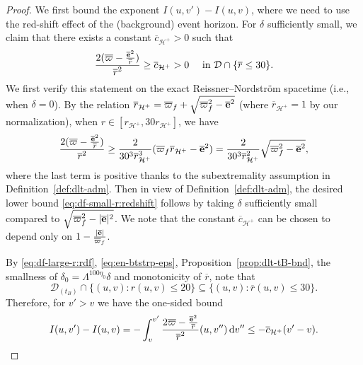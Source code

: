 \documentclass[10pt, reqno]{amsart}
\theoremstyle{definition}
\theoremstyle{remark}
\theoremstyle{conjecture}
\numberwithin{equation}{section}
\newcommand{\abs}[1]{\vert#1\vert}
\newcommand{\set}[1]{\{#1\}}
\newcommand{\ud}{\mathrm{d}}
\newcommand{\0}{\emptyset}
\newcommand{\dlt}{\delta}
\newcommand{\Lmb}{\Lambda}
\newcommand{\bfe}{{\bf e}}
\newcommand{\calD}{\mathcal D}
\newcommand{\calH}{\mathcal H}
\newcommand{\de}{\delta}
\newcommand{\EH}{\calH^{+}}
\newcommand{\e}{\bfe}							%
\newcommand{\rbg}{\overline{r}}					%
\newcommand{\varpibg}{\overline{\varpi}}				%
\newcommand{\ebg}{\overline{\e}}					%
\begin{document}
\begin{proof}
We first bound the exponent $I(u, v') - I(u, v)$, where we need to use the red-shift effect of the (background) event horizon. For $\dlt$ sufficiently small, we claim that there exists a constant $\overline{c}_{\EH} > 0$  such that
\begin{equation} \label{eq:df-small-r:redshift}
\frac{2 (\varpibg - \frac{\ebg^{2}}{\rbg})}{\rbg^{2}} \geq \overline{c}_{\EH} > 0 \quad \hbox{ in } \calD \cap \set{\rbg \leq 30}.
\end{equation}
We first verify this statement on the exact Reissner--Nordstr\"om spacetime (i.e., when $\dlt = 0$). By the relation $\rbg_{\EH} = \varpibg_{f} + \sqrt{\varpibg_{f}^{2} - \overline{\e}^{2}}$ (where $\rbg_{\EH} = 1$ by our normalization), when $r\in [r_{\EH}, 30 r_{\EH}]$, we have
\begin{equation*}
	\frac{2 (\varpibg - \frac{\ebg^{2}}{\rbg})}{\rbg^{2}} 
\geq \frac{2}{30^{3} \rbg_{\EH}^{3}} (\varpibg_{f} \rbg_{\EH} - \ebg^{2})
= \frac{2}{30^{3} \rbg_{\EH}^{2}} \sqrt{\varpibg_{f}^{2} - \ebg^{2}},
\end{equation*}
where the last term is positive thanks to the subextremality assumption in Definition~\ref{def:dlt-adm}. Then in view of Definition~\ref{def:dlt-adm}, the desired lower bound \eqref{eq:df-small-r:redshift} follows by taking $\dlt$ sufficiently small compared to $\sqrt{\varpibg_{f}^{2}-\abs{\ebg}^{2}}$.
We note that the constant $\overline{c}_{\EH}$ can be chosen to depend only on $1-\frac{\abs{\ebg}}{\varpibg_{f}}$.

By \eqref{eq:df-large-r:rdf}, \eqref{eq:en-btstrp-eps}, Proposition~\ref{prop:dlt-tB-bnd}, the smallness of $\de_0=\Lmb^{100\eta_0}\de$ and monotonicity of $\rbg$, note that 
\begin{equation*}
\calD_{(t_{B})} \cap \set{(u, v) : r(u, v) \leq 20} \subseteq \set{(u, v) : \rbg(u, v) \leq 30}.
\end{equation*}
Therefore, for $v' > v$ we have the one-sided bound
\begin{equation} \label{eq:dvrdf-exp}
	I(u, v') - I(u, v)
	= - \int_{v}^{v'} \frac{2 \varpibg - \frac{\ebg^{2}}{\rbg}}{\rbg^{2}}(u, v'') \, \ud v''
	\leq - \overline{c}_{\EH} (v' - v).
\end{equation}


\end{proof}
\end{document}
